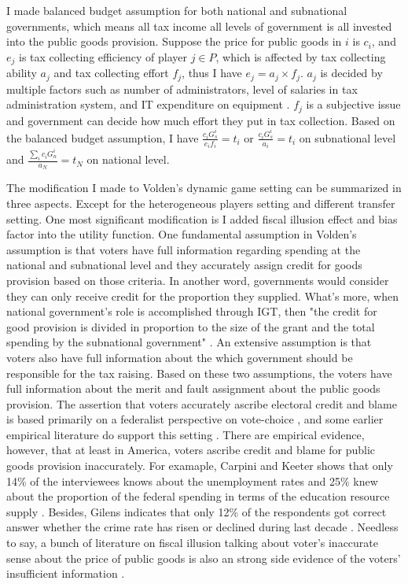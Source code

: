 \begin{itemize}
I made balanced budget assumption for both national and subnational governments, which means all tax income all levels of government is all invested into the public goods provision. Suppose the price for public goods in $i$ is $c_i$, and $e_j$ is tax collecting efficiency of player $j \in P$, which is affected by tax collecting ability $a_j$ and tax collecting effort $f_j$, thus I have $e_j=a_j \times f_j$. $a_j$ is decided by multiple factors such as number of administrators, level of salaries in tax administration system, and IT expenditure on equipment \cite{savic2015impact,kiser1994could,aizenman2008collection,mattos2011flypaper}. $f_j$ is a subjective issue and government can decide how much effort they put in tax collection. Based on the balanced budget assumption, I have $\frac{c_i G_s^i}{e_i f_i}=t_i$ or $\frac{c_i G_s^i}{a_i}=t_i$ on subnational level\label{priceandeffort} and $\frac{\sum_i c_i G_n^i}{a_N}=t_N$ on national level.

The modification I made to Volden's dynamic game setting can be summarized in three aspects. Except for the heterogeneous players setting and different transfer setting. One most significant modification is I added fiscal illusion effect and bias factor into the utility function. One fundamental assumption in Volden's assumption is that voters have full information regarding spending at the national and subnational level and they accurately assign credit for goods provision based on those criteria. In another word, governments would consider they can only receive credit for the proportion they supplied. What's more, when national government's role is accomplished through IGT, then "the credit for good provision is divided in proportion to the size of the grant and the total spending by the subnational government" \cite{volden2005intergovernmental}. An extensive assumption is that voters also have full information about the which government should be responsible for the tax raising. Based on these two assumptions, the voters have full information about the merit and fault assignment about the public goods provision. The assertion that voters accurately ascribe electoral credit and blame is based primarily on a federalist perspective on vote-choice \cite{stein1990economic}, and some earlier empirical literature do support this setting \cite{atkeson1995economic}. There are empirical evidence, however, that at least in America, voters ascribe credit and blame for public goods provision inaccurately. For examaple, Carpini and Keeter shows that only 14\% of the interviewees knows about the unemployment rates and 25\% knew about the proportion of the federal spending in terms of the education resource supply \cite{carpini1996americans}. Besides, Gilens indicates that only 12\% of the respondents got correct answer whether the crime rate has risen or declined during last decade \cite{gilens2001political}. Needless to say, a bunch of literature on fiscal illusion talking about voter's inaccurate sense about the price of public goods is also an strong side evidence of the voters' insufficient information \cite{oates1979lump,borge1995lump,turnbull1998overspending}.


\end{itemize}
